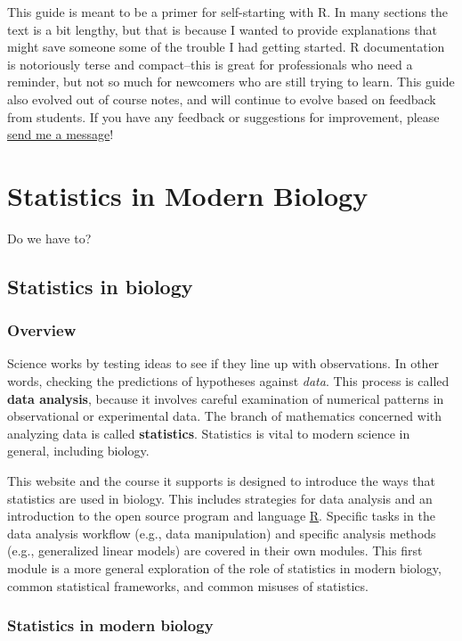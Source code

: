 \documentclass[
  13,
  letterpaper,
]{report}
\begin{document}
This guide is meant to be a primer for self-starting with R. In many
sections the text is a bit lengthy, but that is because I wanted to
provide explanations that might save someone some of the trouble I had
getting started. R documentation is notoriously terse and compact--this
is great for professionals who need a reminder, but not so much for
newcomers who are still trying to learn. This guide also evolved out of
course notes, and will continue to evolve based on feedback from
students. If you have any feedback or suggestions for improvement,
please \href{mailto:ngreen62@kennesaw.edu}{send me a message}!

\part{Statistics in Modern Biology}

Do we have to?

\chapter{Statistics in biology}\label{sec-01}

\section{Overview}\label{sec-01-over}

Science works by testing ideas to see if they line up with observations.
In other words, checking the predictions of hypotheses against
\emph{data}. This process is called \textbf{data analysis}, because it
involves careful examination of numerical patterns in observational or
experimental data. The branch of mathematics concerned with analyzing
data is called \textbf{statistics}. Statistics is vital to modern
science in general, including biology.

This website and the course it supports is designed to introduce the
ways that statistics are used in biology. This includes strategies for
data analysis and an introduction to the open source program and
language \href{https://www.r-project.org/}{R}. Specific tasks in the
data analysis workflow (e.g., data manipulation) and specific analysis
methods (e.g., generalized linear models) are covered in their own
modules. This first module is a more general exploration of the role of
statistics in modern biology, common statistical frameworks, and common
misuses of statistics.

\section{Statistics in modern biology}\label{sec-01-modern}
\end{document}
